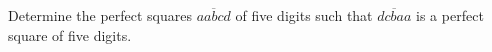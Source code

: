 Determine the perfect squares $ \overline{aabcd} $ of five digits such that $ \overline{dcbaa} $ is a perfect square of five digits.